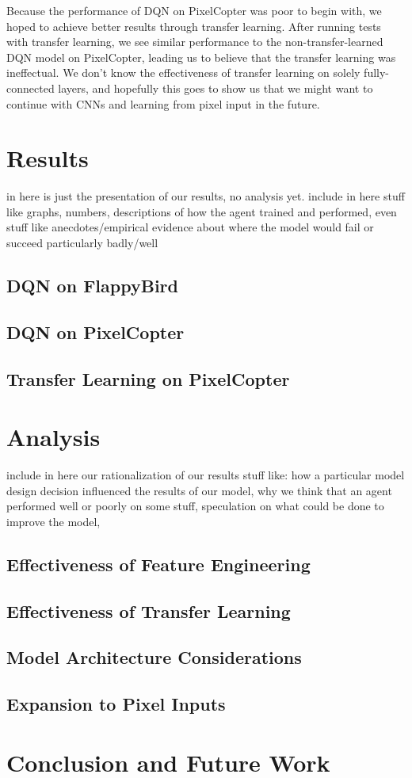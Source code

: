 \documentclass{article}
\begin{document}
Because the performance of DQN on PixelCopter was poor to begin with, we hoped to achieve better results through transfer learning.
After running tests with transfer learning, we see similar performance to the non-transfer-learned DQN model on PixelCopter, leading us to believe that the transfer learning was ineffectual.
We don't know the effectiveness of transfer learning on solely fully-connected layers, and hopefully this goes to show us that we might want to continue with CNNs and learning from pixel input in the future.



\section{Results}


in here is just the presentation of our results, no analysis yet.
include in here stuff like graphs, numbers, descriptions of how the agent trained and performed, even stuff like anecdotes/empirical evidence about where the model would fail or succeed particularly badly/well

\subsection{DQN on FlappyBird}

\subsection{DQN on PixelCopter}

\subsection{Transfer Learning on PixelCopter}

\section{Analysis}

include in here our rationalization of our results
stuff like: how a particular model design decision influenced the results of our model, why we think that an agent performed well or poorly on some stuff, speculation on what could be done to improve the model, 

\subsection{Effectiveness of Feature Engineering}

\subsection{Effectiveness of Transfer Learning}

\subsection{Model Architecture Considerations}

\subsection{Expansion to Pixel Inputs}

\section{Conclusion and Future Work}




\end{document}
